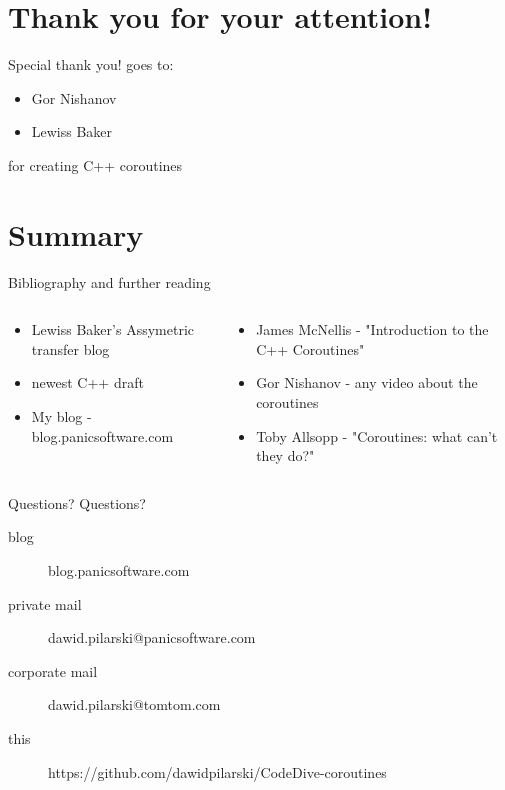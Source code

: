 \documentclass[10pt]{beamer}
\begin{document}
\section*{Thank you for your attention!}

\begin{frame}{Special thank you! goes to:}
	\begin{itemize}
		\item Gor Nishanov
		\item Lewiss Baker	
	\end{itemize}

	for creating C++ coroutines 
\end{frame}

\section*{Summary}

\begin{frame}{Bibliography and further reading}
\begin{columns}
\begin{column}{0.48\linewidth}
	\begin{itemize}
		\item Lewiss Baker's Assymetric transfer blog
		\item newest C++ draft
		\item My blog - blog.panicsoftware.com
	\end{itemize}
\end{column}
\begin{column}{0.48\linewidth}
	\begin{itemize}
		\item James McNellis - "Introduction to the C++ Coroutines"
		\item Gor Nishanov - any video about the coroutines
		\item Toby Allsopp - "Coroutines: what can't they do?"
	\end{itemize}
\end{column}

\end{columns}
\end{frame}

\begin{frame}{Questions?}
\vfill
\centering Questions?
\vfill

\small
\begin{description}
	\item [blog] blog.panicsoftware.com
	\item [private mail] dawid.pilarski@panicsoftware.com
	\item [corporate mail] dawid.pilarski@tomtom.com
	\item [this] https://github.com/dawidpilarski/CodeDive-coroutines
\end{description}
\end{frame}
\end{document}
